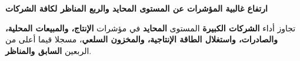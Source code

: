 \textbf{ارتفاع غالبية المؤشرات عن المستوى المحايد والربع المناظر لكافة الشركات}

تجاوز أداء \textbf{الشركات الكبيرة} المستوى \textbf{المحايد} في مؤشرات \textbf{الإنتاج، والمبيعات المحلية، والصادرات، واستغلال الطاقة الإنتاجية، والمخزون السلعي}، مسجلا قيما أعلى من الربعين \textbf{السابق والمناظر}.
